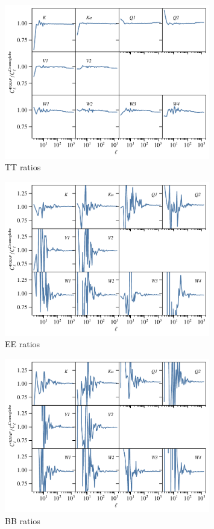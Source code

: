 \documentclass[twocolumn]{../../common/aa}
\begin{document}
\begin{figure}
	\centering
	\includegraphics[width=0.8\textwidth]{figures/TT_spectra_ratio.pdf}
	\caption{TT ratios}
\end{figure}
\begin{figure}
	\centering
	\includegraphics[width=0.8\textwidth]{figures/EE_spectra_ratio.pdf}
	\caption{EE ratios}
\end{figure}
\begin{figure}
	\centering
	\includegraphics[width=0.8\textwidth]{figures/BB_spectra_ratio.pdf}
	\caption{BB ratios}
\end{figure}
\end{document}
